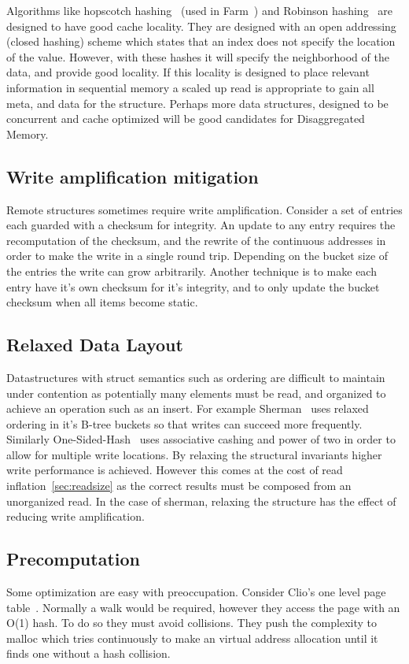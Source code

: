 Algorithms like hopscotch hashing~\cite{hopscotch} (used in Farm~\cite{farm})
and Robinson hashing~\cite{robinhood} are designed to have good cache locality.
They are designed with an open addressing (closed hashing) scheme which states
that an index does not specify the location of the value. However, with these
hashes it will specify the neighborhood of the data, and provide good locality.
If this locality is designed to place relevant information in sequential memory
a scaled up read is appropriate to gain all meta, and data for the structure.
Perhaps more data structures, designed to be concurrent and cache optimized will
be good candidates for Disaggregated Memory.

\subsection{Write amplification mitigation}
\label{sec:write-amplification}
Remote structures sometimes require write
amplification. Consider a set of entries each guarded with a checksum for
integrity. An update to any entry requires the recomputation of the checksum,
and the rewrite of the continuous addresses in order to make the write in a
single round trip. Depending on the bucket size of the entries the write can
grow arbitrarily. Another technique is to make each entry have it's own checksum
for it's integrity, and to only update the bucket checksum when all items become
static.

\subsection{Relaxed Data Layout} Datastructures with struct semantics such as
ordering are difficult to maintain under contention as potentially many elements
must be read, and organized to achieve an operation such as an insert. For
example Sherman~\cite{sherman} uses relaxed ordering in it's B-tree buckets so
that writes can succeed more frequently. Similarly
One-Sided-Hash~\cite{one-sided-hash} uses associative cashing and power of two
in order to allow for multiple write locations. By relaxing the structural
invariants higher write performance is achieved. However this comes at the cost
of read inflation~\ref{sec:readsize} as the correct results must be composed
from an unorganized read. In the case of sherman, relaxing the structure has the
effect of reducing write amplification.

\subsection{Precomputation} Some optimization are easy with preoccupation. Consider
Clio's one level page table~\cite{clio}. Normally a walk would be required, however they
access the page with an O(1) hash. To do so they must avoid collisions. They
push the complexity to malloc which tries continuously to make an virtual address
allocation until it finds one without a hash collision.


